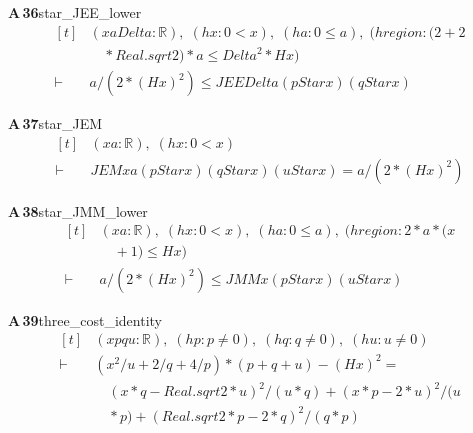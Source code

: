 \documentclass[conference]{IEEEtran}
\theoremstyle{definition}
\newcommand{\lean}[1]{\textsf{\footnotesize #1}}
\begin{document}
\noindent\textbf{A\,36}\quad\lean{star\_JEE\_lower}
{\footnotesize\[ \begin{aligned}[t]
&(\mathit{x} \mathit{a} \mathit{Delta} : \mathbb{R} ),\; (\mathit{hx} : 0<\mathit{x}),\; (\mathit{ha} : 0\leq \mathit{a}),\; (\mathit{hregion} : (2+2\\
&\quad *\mathit{Real}.\mathit{sqrt} 2)*\mathit{a} \leq \mathit{Delta}^{2}*\mathit{H} \mathit{x})\\
\vdash\;&\mathit{a}/(2*(\mathit{H} \mathit{x})^{2}) \leq \mathit{JEE} \mathit{Delta} (\mathit{pStar} \mathit{x}) (\mathit{qStar} \mathit{x})
\end{aligned} \]}

\noindent\textbf{A\,37}\quad\lean{star\_JEM}
{\footnotesize\[ \begin{aligned}[t]
&(\mathit{x} \mathit{a} : \mathbb{R} ),\; (\mathit{hx} : 0<\mathit{x})\\
\vdash\;&\mathit{JEM} \mathit{x} \mathit{a} (\mathit{pStar} \mathit{x}) (\mathit{qStar} \mathit{x}) (\mathit{uStar} \mathit{x})=\mathit{a}/(2*(\mathit{H} \mathit{x})^{2})
\end{aligned} \]}

\noindent\textbf{A\,38}\quad\lean{star\_JMM\_lower}
{\footnotesize\[ \begin{aligned}[t]
&(\mathit{x} \mathit{a} : \mathbb{R} ),\; (\mathit{hx} : 0<\mathit{x}),\; (\mathit{ha} : 0\leq \mathit{a}),\; (\mathit{hregion} : 2*\mathit{a}*(\mathit{x}\\
&\quad +1) \leq \mathit{H} \mathit{x})\\
\vdash\;&\mathit{a}/(2*(\mathit{H} \mathit{x})^{2}) \leq \mathit{JMM} \mathit{x} (\mathit{pStar} \mathit{x}) (\mathit{uStar} \mathit{x})
\end{aligned} \]}

\noindent\textbf{A\,39}\quad\lean{three\_cost\_identity}
{\footnotesize\[ \begin{aligned}[t]
&(\mathit{x} \mathit{p} \mathit{q} \mathit{u} : \mathbb{R} ),\; (\mathit{hp} : \mathit{p}\neq 0),\; (\mathit{hq} : \mathit{q}\neq 0),\; (\mathit{hu} : \mathit{u}\neq 0)\\
\vdash\;&(\mathit{x}^{2}/\mathit{u}+2/\mathit{q}+4/\mathit{p})*(\mathit{p}+\mathit{q}+\mathit{u})-(\mathit{H} \mathit{x})^{2} =\\
&\quad (\mathit{x}*\mathit{q}-\mathit{Real}.\mathit{sqrt} 2*\mathit{u})^{2}/(\mathit{u}*\mathit{q}) + (\mathit{x}*\mathit{p}-2*\mathit{u})^{2}/(\mathit{u}\\
&\quad *\mathit{p}) + (\mathit{Real}.\mathit{sqrt} 2*\mathit{p}-2*\mathit{q})^{2}/(\mathit{q}*\mathit{p})
\end{aligned} \]}
\end{document}
